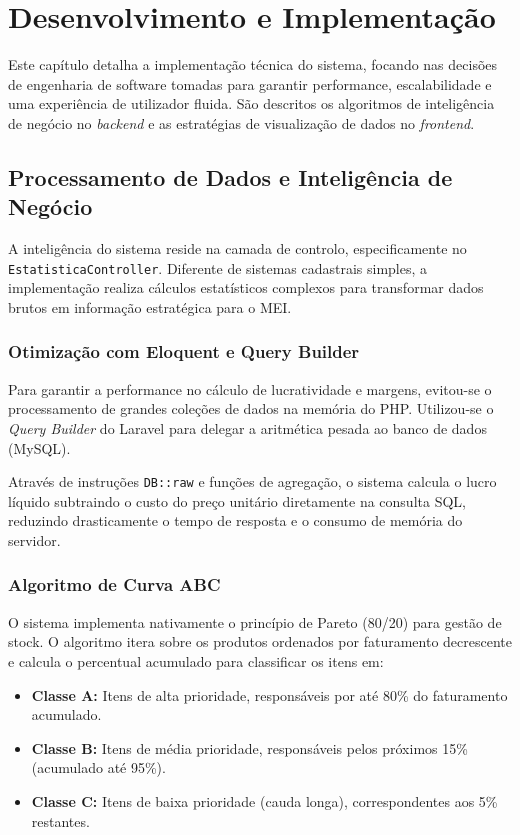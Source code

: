 
\chapter{Desenvolvimento e Implementação}
\label{cap:desenvolvimento}

Este capítulo detalha a implementação técnica do sistema, focando nas decisões de engenharia de software tomadas para garantir performance, escalabilidade e uma experiência de utilizador fluida. São descritos os algoritmos de inteligência de negócio no \textit{backend} e as estratégias de visualização de dados no \textit{frontend}.

\section{Processamento de Dados e Inteligência de Negócio}
\label{sec:processamento}

A inteligência do sistema reside na camada de controlo, especificamente no \texttt{EstatisticaController}. Diferente de sistemas cadastrais simples, a implementação realiza cálculos estatísticos complexos para transformar dados brutos em informação estratégica para o MEI.

\subsection{Otimização com Eloquent e Query Builder}
Para garantir a performance no cálculo de lucratividade e margens, evitou-se o processamento de grandes coleções de dados na memória do PHP. Utilizou-se o \textit{Query Builder} do Laravel para delegar a aritmética pesada ao banco de dados (MySQL).

Através de instruções \texttt{DB::raw} e funções de agregação, o sistema calcula o lucro líquido subtraindo o custo do preço unitário diretamente na consulta SQL, reduzindo drasticamente o tempo de resposta e o consumo de memória do servidor.

\subsection{Algoritmo de Curva ABC}
O sistema implementa nativamente o princípio de Pareto (80/20) para gestão de stock. O algoritmo itera sobre os produtos ordenados por faturamento decrescente e calcula o percentual acumulado para classificar os itens em:

\begin{itemize}
    \item \textbf{Classe A:} Itens de alta prioridade, responsáveis por até 80\% do faturamento acumulado.
    \item \textbf{Classe B:} Itens de média prioridade, responsáveis pelos próximos 15\% (acumulado até 95\%).
    \item \textbf{Classe C:} Itens de baixa prioridade (cauda longa), correspondentes aos 5\% restantes.
\end{itemize}

